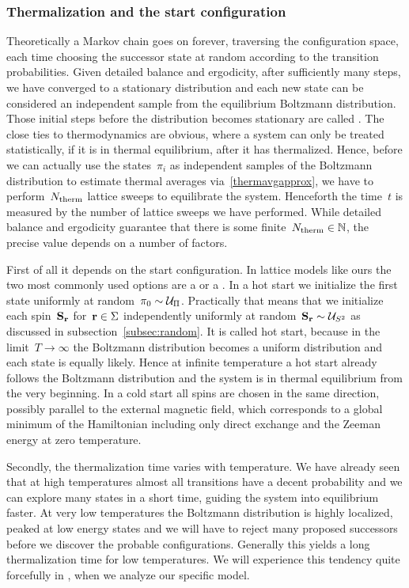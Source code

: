 \subsubsection{Thermalization and the start configuration}

Theoretically a Markov chain goes on forever, traversing the configuration
space, each time choosing the successor state at random according to the
transition probabilities. Given detailed balance and ergodicity, after
sufficiently many steps, we have converged to a stationary distribution and each
new state can be considered an independent sample from the equilibrium Boltzmann
distribution. Those initial steps before the distribution becomes stationary are
called . The close ties to thermodynamics are obvious,
where a system can only be treated statistically, if it is in thermal
equilibrium, \ie{} after it has thermalized. Hence, before we can actually use
the states~$\pi_i$ as independent samples of the Boltzmann distribution to
estimate thermal averages via~\eqref{thermavgapprox}, we have to
perform~$N_{\mathrm{therm}}$ lattice sweeps to equilibrate the system. Henceforth the
time~$t$ is measured by the number of lattice sweeps we have performed. While
detailed balance and ergodicity guarantee that there is some finite~$N_{\mathrm{therm}} \in
\mathbb{N}$, the precise value depends on a number of factors.

First of all it depends on the start configuration. In lattice models like ours
the two most commonly used options are a  or a . In a hot start we initialize the first state uniformly at random~$\pi_0
\sim \mathcal{U}_{\Pi}$. Practically that means that we initialize each spin~$\mathbf{S}_{\mathbf{r}}$
for~$\mathbf{r} \in \Sigma$ independently uniformly at random~$\mathbf{S}_{\mathbf{r}} \sim \mathcal{U}_{S^2}$
as discussed in subsection~\ref{subsec:random}. It is called hot start, because
in the limit~$T\to \infty$ the Boltzmann distribution becomes a uniform
distribution and each state is equally likely. Hence at infinite temperature a
hot start already follows the Boltzmann distribution and the system is in
thermal equilibrium from the very beginning. In a cold start all spins are
chosen in the same direction, possibly parallel to the external magnetic field,
which corresponds to a global minimum of the Hamiltonian including only direct
exchange and the Zeeman energy at zero temperature.

Secondly, the thermalization time varies with temperature. We have already seen
that at high temperatures almost all transitions have a decent probability and
we can explore many states in a short time, guiding the system into equilibrium
faster. At very low temperatures the Boltzmann distribution is highly localized,
peaked at low energy states and we will have to reject many proposed successors
before we discover the probable configurations. Generally this yields a long
thermalization time for low temperatures. We will experience this tendency quite
forcefully in , when we analyze our specific model.

